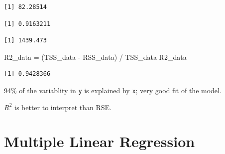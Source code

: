 \documentclass[
  letterpaper,
  DIV=11,
  numbers=noendperiod]{scrreprt}
\newenvironment{Shaded}{\begin{snugshade}}{\end{snugshade}}
\newcommand{\DecValTok}[1]{\textcolor[rgb]{0.47,0.16,0.63}{#1}}
\newcommand{\FunctionTok}[1]{\textcolor[rgb]{0.02,0.16,0.49}{#1}}
\newcommand{\NormalTok}[1]{\textcolor[rgb]{0.33,0.33,0.33}{#1}}
\newcommand{\OtherTok}[1]{\textcolor[rgb]{0.85,0.12,0.09}{#1}}
\newcommand{\SpecialCharTok}[1]{\textcolor[rgb]{0.00,0.46,0.62}{#1}}
\begin{document}
\begin{verbatim}
[1] 82.28514
\end{verbatim}

\begin{Shaded}
\end{Shaded}

\begin{verbatim}
[1] 0.9163211
\end{verbatim}

\begin{Shaded}
\end{Shaded}

\begin{verbatim}
[1] 1439.473
\end{verbatim}

\begin{Shaded}
\begin{Highlighting}[]
\NormalTok{R2\_data }\OtherTok{=}\NormalTok{ (TSS\_data }\SpecialCharTok{{-}}\NormalTok{ RSS\_data) }\SpecialCharTok{/}\NormalTok{ TSS\_data}
\NormalTok{R2\_data}
\end{Highlighting}
\end{Shaded}

\begin{verbatim}
[1] 0.9428366
\end{verbatim}

94\% of the variablity in \texttt{y} is explained by \texttt{x}; very
good fit of the model.

\(R^2\) is better to interpret than RSE.

\hypertarget{multiple-linear-regression}{%
\section{Multiple Linear Regression}\label{multiple-linear-regression}}
\end{document}
